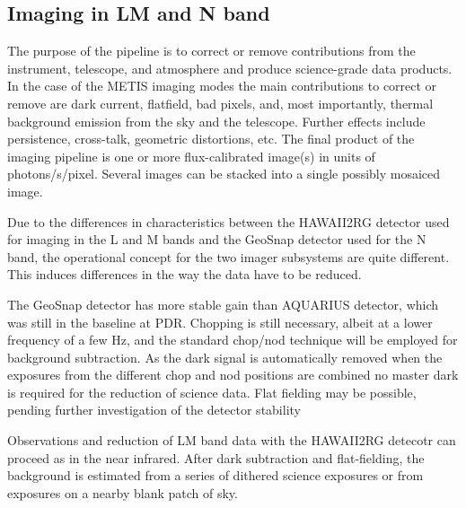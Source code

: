 \subsection{Imaging in LM and N band}
\label{ssec:overview_imaging}

The purpose of the pipeline is to correct or remove contributions from
the instrument, telescope, and atmosphere and produce science-grade
data products.  In the case of the METIS imaging modes the main
contributions to correct or remove are dark current, flatfield, bad
pixels, and, most importantly, thermal background emission from the
sky and the telescope. Further effects include persistence,
cross-talk, geometric distortions, etc. The final product of the
imaging pipeline is one or more flux-calibrated image(s) in units of
photons/s/pixel. Several images can be stacked into a single possibly
mosaiced image.

Due to the differences in characteristics between the HAWAII2RG
detector used for imaging in the L and M bands and the GeoSnap
detector used for the N band, the operational concept for the two
imager subsystems are quite different. This induces differences in the
way the data have to be reduced.

The GeoSnap detector has more stable gain than AQUARIUS detector,
which was still in the baseline at PDR.  Chopping is still necessary,
albeit at a lower frequency of a few Hz, and the standard chop/nod
technique will be employed for background subtraction.  As the dark
signal is automatically removed when the exposures from the different
chop and nod positions are combined no master dark is required for the
reduction of science data. Flat fielding may be possible, pending
further investigation of the detector stability

Observations and reduction of LM band data with the HAWAII2RG detecotr
can proceed as in the near infrared. After dark subtraction and
flat-fielding, the background is estimated from a series of dithered
science exposures or from exposures on a nearby blank patch of sky.


